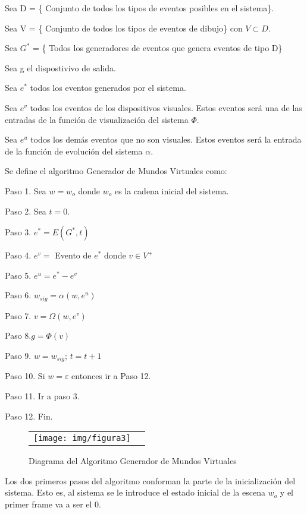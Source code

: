 \documentclass{egpubl}
\begin{document}
\begin{itshape}
Sea D = \{ Conjunto de todos los tipos de eventos posibles en el
sistema\}.

Sea V = \{ Conjunto de todos los tipos de eventos de dibujo\} con
$V \subset D$.


Sea $G^{*}$ = \{ Todos los generadores de eventos que genera eventos de tipo D\}

Sea g el dispostivivo de salida.

Sea $e^{*}$ todos los eventos generados por el sistema.

Sea $e^{v}$ todos los eventos de los dispositivos visuales. Estos eventos ser\'a
una de las entradas de la funci\'on de visualizaci\'on del sistema $\Phi$.

Sea $e^{u}$ todos los dem\'as eventos que no son visuales. Estos eventos ser\'a la entrada de 
la funci\'on de evoluci\'on del sistema $\alpha$.


Se define el algoritmo Generador de Mundos Virtuales como:


Paso 1. Sea $w = w_{o}$ donde $w_{o}$ es la cadena inicial del sistema.


Paso 2. Sea $t = 0$.


Paso 3. $e^{*} = E(G^{*}, t)$


Paso 4. $e^{v} =$ Evento de $e^{*}$ donde $v \in V^{+}$


Paso 5. $e^{u} = e^{*} - e^{v}$


Paso 6. $w_{sig} = \alpha (w, e^{u})$


Paso 7. $v = \Omega (w, e^{v})$


Paso 8.$g=\Phi (v)$


Paso 9. $w = w_{sig}$; $t = t+1$


Paso 10. Si $w = \varepsilon$ entonces ir a Paso 12.


Paso 11. Ir a paso 3.


Paso 12. Fin.

\end{itshape}

\begin{figure}[htb]
  	\centering
	\begin{tabular}{cc}
  		\texttt{[image: img/figura3]}
	\end{tabular}
 	\caption{\label{fig:ejemplo} Diagrama del Algoritmo Generador de Mundos Virtuales}
\end{figure}

Los dos primeros pasos del algoritmo conforman la parte de la inicializaci\'on del sistema. Esto es, al sistema se le introduce el estado inicial de la escena $w_{o}$ y el primer frame va a ser el 0.
\end{document}
